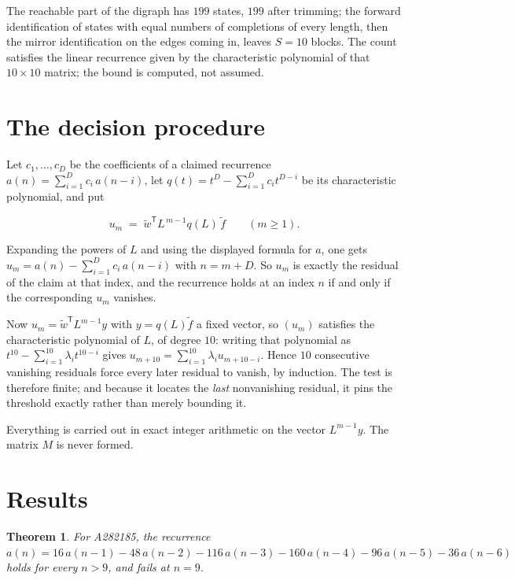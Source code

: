 \documentclass[11pt]{article}
\newtheorem{theorem}{Theorem}
\theoremstyle{definition}
\begin{document}
The reachable part of the digraph has $199$ states, $199$ after trimming; the forward identification of states with equal numbers of completions of every length, then the mirror identification on the edges coming in, leaves $S = 10$ blocks. The count satisfies the linear recurrence given by the characteristic polynomial of that $10\times10$ matrix; the bound is computed, not assumed.

\section{The decision procedure}

Let $c_1,\dots,c_D$ be the coefficients of a claimed recurrence $a(n) = \sum_{i=1}^{D} c_i\,a(n-i)$, let $q(t) = t^{D} - \sum_{i=1}^{D} c_i t^{D-i}$ be its characteristic polynomial, and put

\[u_m \;=\; \tilde w^{\mathsf T} L^{\,m-1} q(L)\,\tilde f \qquad (m \ge 1).\]

Expanding the powers of $L$ and using the displayed formula for $a$, one gets $u_m = a(n) - \sum_{i=1}^{D} c_i\,a(n-i)$ with $n = m + D$. So $u_m$ is exactly the residual of the claim at that index, and the recurrence holds at an index $n$ if and only if the corresponding $u_m$ vanishes.

Now $u_m = \tilde w^{\mathsf T} L^{m-1} y$ with $y = q(L)\tilde f$ a fixed vector, so $(u_m)$ satisfies the characteristic polynomial of $L$, of degree $10$: writing that polynomial as $t^{10} - \sum_{i=1}^{10} \lambda_i t^{10-i}$ gives $u_{m+10} = \sum_{i=1}^{10} \lambda_i u_{m+10-i}$. Hence $10$ consecutive vanishing residuals force every later residual to vanish, by induction. The test is therefore finite; and because it locates the {\itshape last} nonvanishing residual, it pins the threshold exactly rather than merely bounding it.

Everything is carried out in exact integer arithmetic on the vector $L^{m-1}y$. The matrix $M$ is never formed.

\section{Results}

\begin{theorem} For A282185, the recurrence $a(n) = 16\,a(n-1) - 48\,a(n-2) - 116\,a(n-3) - 160\,a(n-4) - 96\,a(n-5) - 36\,a(n-6)$ holds for every $n > 9$, and fails at $n = 9$.\end{theorem}
\end{document}
